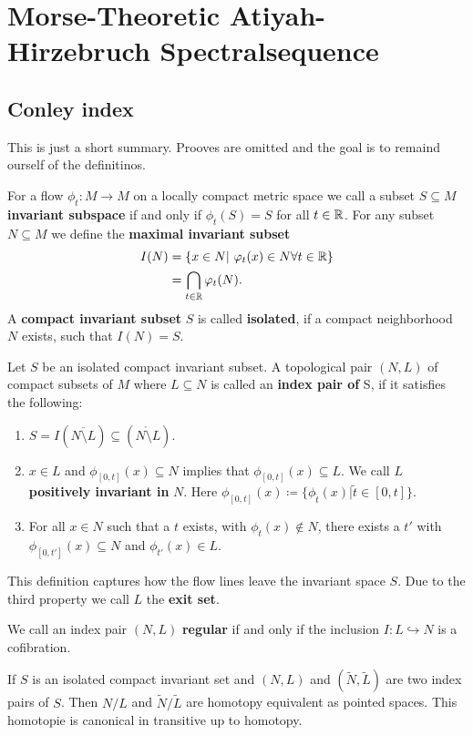 \section{Morse-Theoretic Atiyah-Hirzebruch Spectralsequence}
\subsection{Conley index}
This is just a short summary. Prooves are omitted and the goal is to remaind ourself of the definitinos. 
\begin{definition}
	For a flow $\phi_t:M\to M$ on a locally compact metric space we call a subset $S\subseteq M$ \textbf{invariant subspace} if and only if $\phi_t(S)=S$ for all $t\in \mathbb{R}$. For any subset $N\subseteq M$ we define the \textbf{maximal invariant subset}
	\begin{align*}
		I(N)&=\{x\in N|~ \varphi_t(x)\in N \forall t\in \mathbb{R}\}\\
		&=\bigcap_{t\in \mathbb{R}} \varphi_t(N).
	\end{align*} A \textbf{compact invariant subset} $S$ is called \textbf{isolated}, if a compact neighborhood $N$ exists, such that $I(N)=S$.
\end{definition}
\begin{definition} \label{def: index pairs}
	Let $S$ be an isolated compact invariant subset. A topological pair $(N,L)$ of compact subsets of $M$ where $L\subseteq N$ is called an \textbf{index pair of }S, if it satisfies the following:
	\begin{enumerate}
		\item $S=I(\overline{N\setminus L})\subseteq (\mathring{N\setminus L})$.
		\item  $x\in L$ and $\phi_{[0,t]}(x)\subseteq N$ implies that  $\phi_{[0,t]}(x)\subseteq L$. We call $L$ \textbf{positively invariant in } $N$. Here $\phi_{[0,t]}(x)\coloneq\{ \phi_{\tilde{t}}(x)|\tilde{t}\in [0,t]\}$.
		\item For all $x\in N$ such that a $t$ exists, with $\phi_t(x)\not\in N$, there exists a $t'$ with $\phi_{[0,t']}(x)\subseteq N$ and $\phi_{t'}(x)\in L$.
	\end{enumerate}
	This definition captures how the flow lines leave the invariant space $S$. Due to the third property we call $L$ the \textbf{exit set}.
\end{definition}


\begin{definition}
	We call an index pair $(N,L)$ \textbf{regular} if and only if the inclusion $I: L \hookrightarrow N$ is a cofibration.
\end{definition}
\begin{theorem} \label{thm: Homotopy equivalence of index pairs}
	If $S$ is an isolated compact invariant set and $(N,L)$ and $(\tilde{N},\tilde{L})$ are two index pairs of $S$. Then $N/L$ and $\tilde{N}/\tilde{L}$ are homotopy equivalent as pointed spaces. This homotopie is canonical in transitive up to homotopy. 
\end{theorem}

